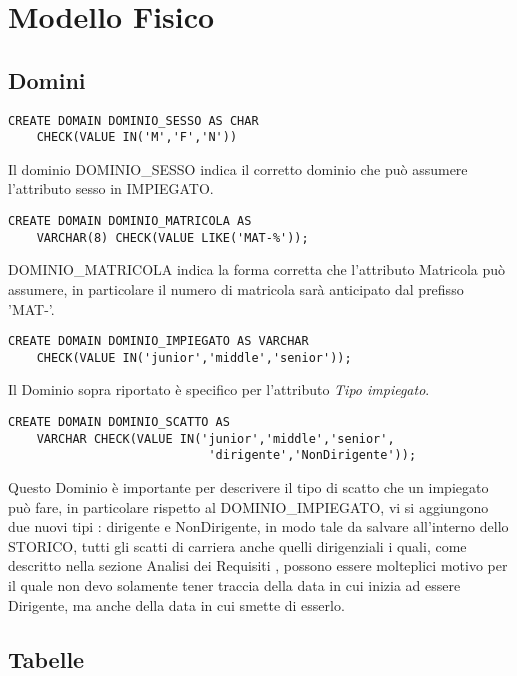 
\section{Modello Fisico}

\subsection{Domini}
\begin{lstlisting}
CREATE DOMAIN DOMINIO_SESSO AS CHAR
    CHECK(VALUE IN('M','F','N'))
\end{lstlisting}

Il dominio DOMINIO\_SESSO indica il corretto dominio che può assumere l'attributo sesso in IMPIEGATO.
\begin{lstlisting}
CREATE DOMAIN DOMINIO_MATRICOLA AS 
    VARCHAR(8) CHECK(VALUE LIKE('MAT-%'));
\end{lstlisting}

DOMINIO\_MATRICOLA indica la forma corretta che l'attributo Matricola può assumere, in particolare il numero di matricola sarà anticipato dal prefisso 'MAT-'.
\begin{lstlisting}
CREATE DOMAIN DOMINIO_IMPIEGATO AS VARCHAR 
    CHECK(VALUE IN('junior','middle','senior'));
\end{lstlisting}

Il Dominio sopra riportato è specifico per l'attributo \textit{Tipo impiegato}.

\begin{lstlisting}
CREATE DOMAIN DOMINIO_SCATTO AS 
    VARCHAR CHECK(VALUE IN('junior','middle','senior',
                            'dirigente','NonDirigente'));
\end{lstlisting}

Questo Dominio è importante per descrivere il tipo di scatto che un impiegato può fare, in particolare rispetto al DOMINIO\_IMPIEGATO, vi si aggiungono due nuovi tipi : dirigente e NonDirigente, in modo tale da salvare all'interno dello STORICO, tutti gli scatti di carriera anche quelli dirigenziali i quali, come descritto nella sezione Analisi dei Requisiti , possono essere molteplici motivo per il quale non devo solamente tener traccia della data in cui inizia ad essere Dirigente, ma anche della data in cui smette di esserlo.


\newpage
\subsection{Tabelle}

